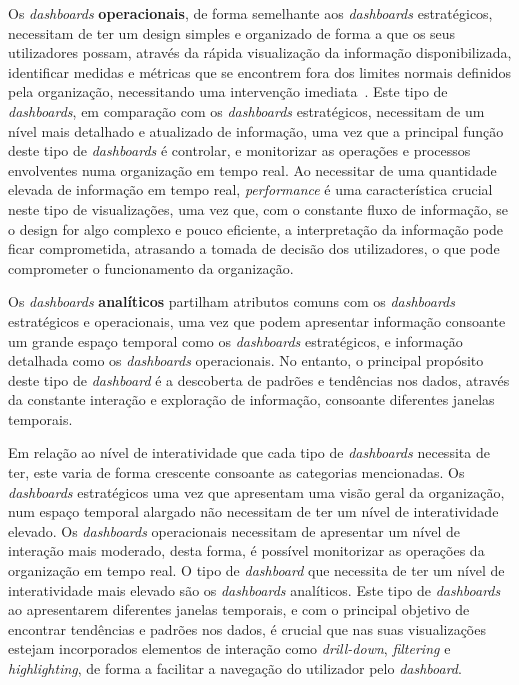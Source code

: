 Os \textit{dashboards} \textbf{operacionais}, de forma semelhante aos \textit{dashboards} estratégicos, necessitam de ter um design simples e organizado de forma a que os seus utilizadores possam, através da rápida visualização da informação disponibilizada, identificar medidas e métricas que se encontrem fora dos limites normais definidos pela organização, necessitando uma intervenção imediata~\cite{pappas2011riding}. Este tipo de \textit{dashboards}, em comparação com os \textit{dashboards} estratégicos, necessitam de um nível mais detalhado e atualizado de informação, uma vez que a principal função deste tipo de \textit{dashboards} é controlar, e monitorizar as operações e processos envolventes numa organização em tempo real. Ao necessitar de uma quantidade elevada de informação em tempo real, \textit{performance} é uma característica crucial neste tipo de visualizações, uma vez que, com o constante fluxo de informação, se o design for algo complexo e pouco eficiente, a interpretação da informação pode ficar comprometida, atrasando a tomada de decisão dos utilizadores, o que pode comprometer o funcionamento da organização.

Os \textit{dashboards} \textbf{analíticos} partilham atributos comuns com os \textit{dashboards} estratégicos e operacionais, uma vez que podem apresentar informação consoante um grande espaço temporal como os \textit{dashboards} estratégicos, e informação detalhada como os \textit{dashboards} operacionais. No entanto, o principal propósito deste tipo de \textit{dashboard} é a descoberta de padrões e tendências nos dados, através da constante interação e exploração de informação, consoante diferentes janelas temporais.

Em relação ao nível de interatividade que cada tipo de \textit{dashboards} necessita de ter, este varia de forma crescente consoante as categorias mencionadas. Os \textit{dashboards} estratégicos uma vez que apresentam uma visão geral da organização, num espaço temporal alargado não necessitam de ter um nível de interatividade elevado. Os \textit{dashboards} operacionais necessitam de apresentar um nível de interação mais moderado, desta forma, é possível monitorizar as operações da organização em tempo real. O tipo de \textit{dashboard} que necessita de ter um nível de interatividade mais elevado são os \textit{dashboards} analíticos. Este tipo de \textit{dashboards} ao apresentarem diferentes janelas temporais, e com o principal objetivo de encontrar tendências e padrões nos dados, é crucial que nas suas visualizações estejam incorporados elementos de interação como \textit{drill-down}, \textit{filtering} e \textit{highlighting}, de forma a facilitar a navegação do utilizador pelo \textit{dashboard}.

